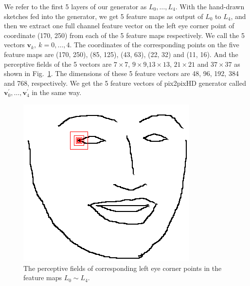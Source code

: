 \documentclass[10pt,twocolumn,letterpaper]{article}
\begin{document}
We refer to the first 5 layers of our generator as $L_0,\ldots,L_4$. With the hand-drawn sketches fed into the generator, we get 5 feature maps as output of $L_0$ to $L_4$, and then we extract one full channel feature vector on the left eye corner point of coordinate (170, 250) from each of the 5 feature maps respectively. We call the 5 vectors $\boldsymbol{v}_k,~k=0,\ldots,4$. The coordinates of the corresponding points on the five feature maps are (170, 250), (85, 125), (43, 63), (22, 32) and (11, 16). And the perceptive fields of the 5 vectors are $7\times7$, $9\times9$,$13\times13$, $21\times21$ and $37\times37$ as shown in Fig.~\ref{fig:receptive}. The dimensions of these 5 feature vectors are 48, 96, 192, 384 and 768, respectively. We get the 5 feature vectors of pix2pixHD generator called $\boldsymbol{v}_0^{'},\ldots,\boldsymbol{v}_4^{'}$ in the same way.
\begin{figure}[htbp]
	\begin{center}
	\includegraphics[width=0.2 \textwidth]{receptive_field.png}
	\end{center}
	\caption{The perceptive fields of corresponding left eye corner points in the feature maps $L_0\sim L_4$. }
	\label{fig:receptive}
\end{figure}
\end{document}
